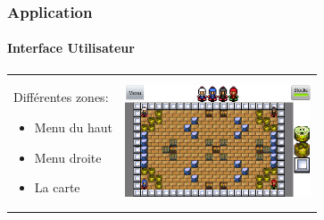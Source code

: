 	
	\begin{frame}
		\frametitle{Application}
		\framesubtitle{Interface Utilisateur}
		
		\begin{center}
               		\begin{tabular}{ll}
                       		\begin{minipage}{4cm}
					Différentes zones:
                                       	\begin{itemize}
                                   	 		\item Menu du haut
						\item Menu droite
						\item La carte
                                    		\end{itemize}
                       		\end{minipage}  &                
                       		\begin{minipage}{5.5cm}
                                		\includegraphics[width=5.5cm]{./img/img8.png}
                       		\end{minipage}\\
               		\end{tabular}
               	\end{center}
	\end{frame}
	
